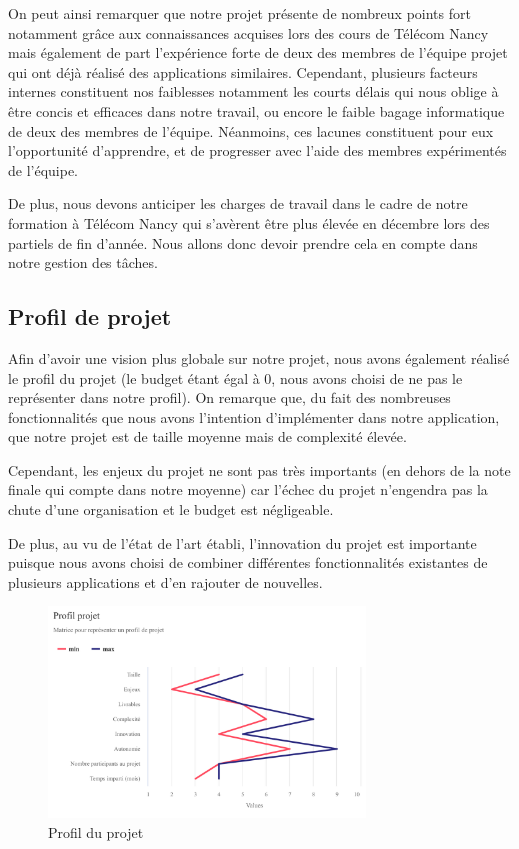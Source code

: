 \documentclass[french,a4paper]{article}
\begin{document}
On peut ainsi remarquer que notre projet présente de nombreux points fort notamment grâce aux connaissances acquises lors des cours de Télécom Nancy mais également de part l’expérience forte de deux des membres de l’équipe projet qui ont déjà réalisé des applications similaires.  Cependant, plusieurs facteurs internes constituent nos faiblesses notamment les courts délais qui nous oblige à être concis et efficaces dans notre travail, ou encore le faible bagage informatique de deux des membres de l’équipe. Néanmoins, ces lacunes constituent pour eux l’opportunité d’apprendre, et de progresser avec l’aide des membres expérimentés de l’équipe.

De plus, nous devons anticiper les charges de travail dans le cadre de notre formation à Télécom Nancy qui s'avèrent être plus élevée en décembre lors des partiels de fin d'année. Nous allons donc devoir prendre cela en compte dans notre gestion des tâches. 

\subsection{Profil de projet}
Afin d’avoir une vision plus globale sur notre projet, nous avons également réalisé le profil du projet (le budget étant égal à 0, nous avons choisi de ne pas le représenter dans notre profil). On remarque que, du fait des nombreuses fonctionnalités que nous avons l’intention d’implémenter dans notre application, que notre projet est de taille moyenne mais de complexité élevée.

Cependant, les enjeux du projet ne sont pas très importants (en dehors de la note finale qui compte dans notre moyenne) car l'échec du projet n'engendra pas la chute d'une organisation et le budget est négligeable.

De plus, au vu de l’état de l’art établi, l’innovation du projet est importante puisque nous avons choisi de combiner différentes fonctionnalités existantes de plusieurs applications et d’en rajouter de nouvelles.

\begin{figure}[H]
    \centering
    \includegraphics[width=0.75\textwidth]{img/profil_projet.png}
    \caption{Profil du projet}
\end{figure} 
\end{document}
